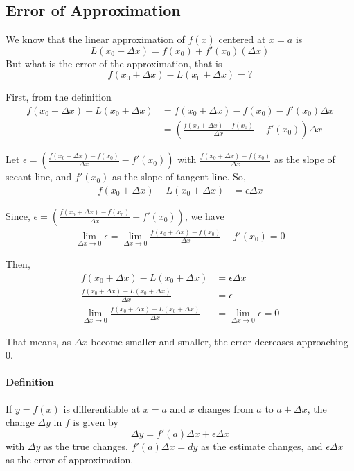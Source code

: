 \documentclass[12pt]{article}
\begin{document}
\subsection{Error of Approximation}
We know that the linear approximation of $f(x)$ centered at $x = a$ is 
\[
    L(x_0 + \Delta x) = f(x_0) + f'(x_0)(\Delta x)
\]
But what is the error of the approximation, that is 
\[
    f(x_0 + \Delta x) - L(x_0 + \Delta x) = ?
\]

\noindent
First, from the definition
\begin{align*} 
     f(x_0 + \Delta x) - L(x_0 + \Delta x) &= f(x_0 + \Delta x) - f(x_0) - f'(x_0) \Delta x \\
     &= \left(\frac{ f(x_0 + \Delta x) - f(x_0)}{\Delta x} - f'(x_0) \right) \Delta x
\end{align*}

\noindent
Let $\epsilon = \left(\frac{ f(x_0 + \Delta x) - f(x_0)}{\Delta x} - f'(x_0) \right)$
with $\frac{ f(x_0 + \Delta x) - f(x_0)}{\Delta x}$ as the slope of secant line, and $f'(x_0)$ as the slope of tangent line. So,
\begin{align*} 
    f(x_0 + \Delta x) - L(x_0 + \Delta x) &= \epsilon \Delta x
\end{align*}

\noindent
Since, $\epsilon = \left(\frac{ f(x_0 + \Delta x) - f(x_0)}{\Delta x} - f'(x_0) \right)$, we have
\begin{align*} 
    \lim_{\Delta x \to 0} \epsilon = \lim_{\Delta x \to 0} \frac{ f(x_0 + \Delta x) - f(x_0)}{\Delta x} - f'(x_0) = 0
\end{align*}

\noindent
Then, 
\begin{align*} 
    f(x_0 + \Delta x) - L(x_0 + \Delta x) &= \epsilon \Delta x \\
    \frac{f(x_0 + \Delta x) - L(x_0 + \Delta x)}{\Delta x} &= \epsilon \\
    \lim_{\Delta x \to 0} \frac{f(x_0 + \Delta x) - L(x_0 + \Delta x)}{\Delta x} &= \lim_{\Delta x \to 0} \epsilon = 0
\end{align*}

That means, as $\Delta x$ become smaller and smaller, the error decreases approaching 0.

\paragraph{Definition}
If $y = f(x)$ is differentiable at $x = a$ and $x$ changes from $a$ to $a + \Delta x$, the
change $\Delta y$ in $f$ is given by
\[
    \Delta y = f'(a)\Delta x + \epsilon \Delta x
\]
with $\Delta y$ as the true changes, $f'(a)\Delta x = dy$ as the estimate changes, and $\epsilon \Delta x$ as the error of approximation.
\end{document}
